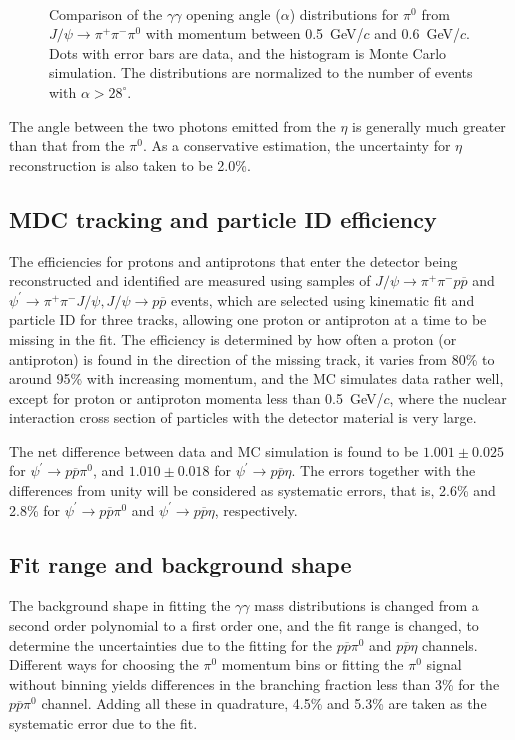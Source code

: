 \documentclass[prd,twocolumn,showpacs,amsmath,amssymb]{revtex4}
\newcommand{\jpsi}{J/\psi}
\newcommand{\pip}{\pi^+}
\newcommand{\pim}{\pi^-}
\newcommand{\piz}{\pi^0}
\newcommand{\ppb}{p\overline{p}}
\newcommand{\ppjpsi}{\pi^+\pi^-\jpsi}
\newcommand{\jpsito}{J/\psi \rightarrow }
\newcommand{\psipto}{\psi^\prime \rightarrow }
\newcommand{\g}{\gamma}
\begin{document}
\begin{figure}[htbp]
\centerline{\hbox{ }}
\caption{Comparison of the $\g\g$ opening angle ($\alpha$)
distributions for $\piz$ from $\jpsito \pip\pim \piz$ with
momentum between 0.5~GeV/$c$ and 0.6~GeV/$c$. Dots with error bars
are data, and the histogram is Monte Carlo simulation. The
distributions are normalized to the number of events with
$\alpha>28^{\circ}$.} \label{aldis}
\end{figure}

The angle between the two photons emitted from the $\eta$ is
generally much greater than that from the $\piz$. As a
conservative estimation, the uncertainty for $\eta$ reconstruction
is also taken to be 2.0\%.

\subsection{MDC tracking and particle ID efficiency}

The efficiencies for protons and antiprotons that enter the
detector being reconstructed and identified are measured using
samples of $\jpsito \pip\pim\ppb$ and $\psi^\prime\rightarrow
\ppjpsi,J/\psi\rightarrow p \overline{p}$ events, which are
selected using kinematic fit and particle ID for three tracks,
allowing one proton or antiproton at a time to be missing in the
fit. The efficiency is determined by how often a proton (or
antiproton) is found in the direction of the missing track, it
varies from 80\% to around 95\% with increasing momentum, and the
MC simulates data rather well, except for proton or antiproton
momenta less than 0.5~GeV/$c$, where the nuclear interaction cross
section of particles with the detector material is very large.

The net difference between data and MC simulation is found to be
$1.001\pm 0.025$ for $\psipto \ppb \piz$, and $1.010\pm 0.018$ for
$\psipto \ppb \eta$. The errors together with the differences from
unity will be considered as systematic errors, that is, 2.6\% and
2.8\% for $\psipto \ppb \piz$ and $\psipto \ppb \eta$,
respectively.

\subsection{Fit range and background shape}

The background shape in fitting the $\g\g$ mass distributions is
changed from a second order polynomial to a first order one, and
the fit range is changed, to determine the uncertainties due to
the fitting for the $\ppb\piz$ and $\ppb\eta$ channels. Different
ways for choosing the $\piz$ momentum bins or fitting the $\piz$
signal without binning yields differences in the branching
fraction less than 3\% for the $\ppb\piz$ channel. Adding all
these in quadrature, 4.5\% and 5.3\% are taken as the systematic
error due to the fit.
\end{document}
